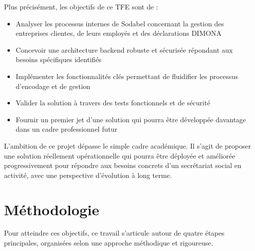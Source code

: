 \noindent Plus précisément, les objectifs de ce TFE sont de :
\begin{itemize}[leftmargin=*,label=\textcolor{darkgray}{$\bullet$},itemsep=0.3em]
  \item Analyser les processus internes de Sodabel concernant la gestion des entreprises clientes, de leurs employés et des déclarations DIMONA
  \item Concevoir une architecture backend robuste et sécurisée répondant aux besoins spécifiques identifiés
  \item Implémenter les fonctionnalités clés permettant de fluidifier les processus d'encodage et de gestion
  \item Valider la solution à travers des tests fonctionnels et de sécurité
  \item Fournir un premier jet d'une solution qui pourra être développée davantage dans un cadre professionnel futur
\end{itemize}

\noindent L'ambition de ce projet dépasse le simple cadre académique. Il s'agit de proposer une solution réellement opérationnelle qui pourra être déployée et améliorée progressivement pour répondre aux besoins concrets d'un secrétariat social en activité, avec une perspective d'évolution à long terme.


\section{Méthodologie}

\noindent Pour atteindre ces objectifs, ce travail s'articule autour de quatre étapes principales, organisées selon une approche méthodique et rigoureuse.

